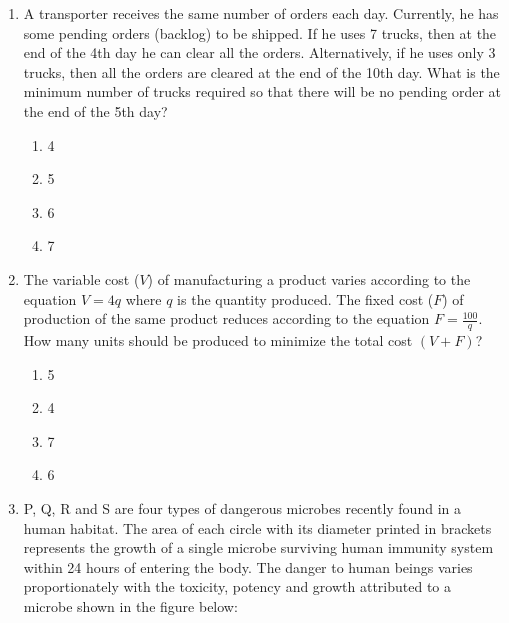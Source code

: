 \documentclass[journal,12pt,onecolumn]{IEEEtran}
\begin{document}
\begin{enumerate}
\hfill{}

\begin{multicols}{2}
\begin{enumerate}
    \item merge
    \item split
    \item collect
    \item separate
\end{enumerate}
\end{multicols}

\item A transporter receives the same number of orders each day. Currently, he has some pending orders (backlog) to be shipped. If he uses 7 trucks, then at the end of the 4th day he can clear all the orders. Alternatively, if he uses only 3 trucks, then all the orders are cleared at the end of the 10th day. What is the minimum number of trucks required so that there will be no pending order at the end of the 5th day?

\hfill{}

\begin{multicols}{2}
\begin{enumerate}
    \item 4
    \item 5
    \item 6
    \item 7
\end{enumerate}
\end{multicols}

\item The variable cost ($V$) of manufacturing a product varies according to the equation $V = 4q$ where $q$ is the quantity produced. The fixed cost ($F$) of production of the same product reduces according to the equation $F = \frac{100}{q}$. How many units should be produced to minimize the total cost $(V+F)$?

\hfill{}
 
\begin{multicols}{2}
\begin{enumerate}
    \item 5
    \item 4
    \item 7
    \item 6
\end{enumerate}
\end{multicols}

\item P, Q, R and S are four types of dangerous microbes recently found in a human habitat. The area of each circle with its diameter printed in brackets represents the growth of a single microbe surviving human immunity system within 24 hours of entering the body. The danger to human beings varies proportionately with the toxicity, potency and growth attributed to a microbe shown in the figure below:


\end{enumerate}
\end{document}
